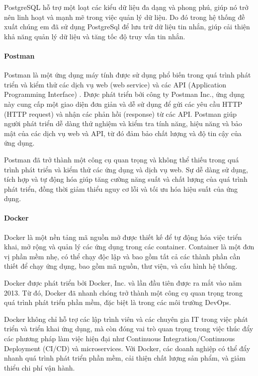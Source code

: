 PostgreSQL hỗ trợ một loạt các kiểu dữ liệu đa dạng và phong phú, giúp nó trở nên linh hoạt và mạnh mẽ trong việc quản lý dữ liệu. Do đó trong hệ thống đề xuất chúng em đã sử dụng PostgreSql để lưu trữ dữ liệu tin nhắn, giúp cải thiện khả năng quản lý dữ liệu và tăng tốc độ truy vấn tin nhắn.
\paragraph{Postman}
\mbox{}

Postman là một ứng dụng máy tính được sử dụng phổ biến trong quá trình phát triển và kiểm thử các dịch vụ web (web service) và các API (Application Programming Interface) \cite{postman_1}. Được phát triển bởi công ty Postman Inc., ứng dụng này cung cấp một giao diện đơn giản và dễ sử dụng để gửi các yêu cầu HTTP (HTTP request) và nhận các phản hồi (response) từ các API. Postman giúp người phát triển dễ dàng thử nghiệm và kiểm tra tính năng, hiệu năng và bảo mật của các dịch vụ web và API, từ đó đảm bảo chất lượng và độ tin cậy của ứng dụng.

Postman đã trở thành một công cụ quan trọng và không thể thiếu trong quá trình phát triển và kiểm thử các ứng dụng và dịch vụ web. Sự dễ dàng sử dụng, tích hợp và tự động hóa giúp tăng cường năng suất và chất lượng của quá trình phát triển, đồng thời giảm thiểu nguy cơ lỗi và tối ưu hóa hiệu suất của ứng dụng.

\paragraph{Docker}
\mbox{}

Docker là một nền tảng mã nguồn mở được thiết kế để tự động hóa việc triển khai, mở rộng và quản lý các ứng dụng trong các container. Container là một đơn vị phần mềm nhẹ, có thể chạy độc lập và bao gồm tất cả các thành phần cần thiết để chạy ứng dụng, bao gồm mã nguồn, thư viện, và cấu hình hệ thống.

Docker được phát triển bởi Docker, Inc. và lần đầu tiên được ra mắt vào năm 2013. Từ đó, Docker đã nhanh chóng trở thành một công cụ quan trọng trong quá trình phát triển phần mềm, đặc biệt là trong các môi trường DevOps.

Docker không chỉ hỗ trợ các lập trình viên và các chuyên gia IT trong việc phát triển và triển khai ứng dụng, mà còn đóng vai trò quan trọng trong việc thúc đẩy các phương pháp làm việc hiện đại như Continuous Integration/Continuous Deployment (CI/CD) và microservices. Với Docker, các doanh nghiệp có thể đẩy nhanh quá trình phát triển phần mềm, cải thiện chất lượng sản phẩm, và giảm thiểu chi phí vận hành.

